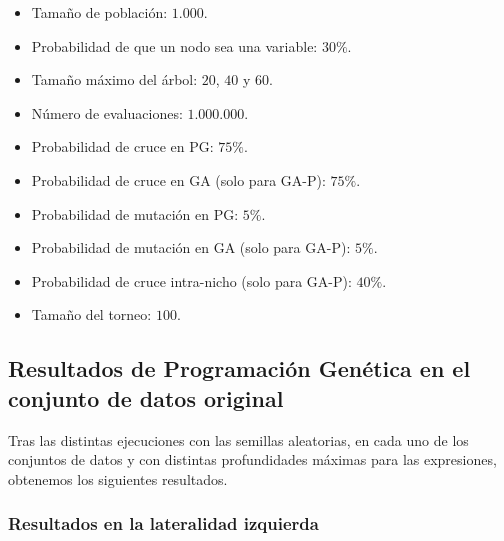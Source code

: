 \begin{itemize}
	\item Tamaño de población: $1.000$.
	\item Probabilidad de que un nodo sea una variable: $30\%$.
	\item Tamaño máximo del árbol: $20$, $40$ y $60$.
	\item Número de evaluaciones: $1.000.000$.
	\item Probabilidad de cruce en PG: $75\%$.
	\item Probabilidad de cruce en GA (solo para GA-P): $75\%$.
	\item Probabilidad de mutación en PG: $5\%$.
	\item Probabilidad de mutación en GA (solo para GA-P): $5\%$.
	\item Probabilidad de cruce intra-nicho (solo para GA-P): $40\%$.
	\item Tamaño del torneo: $100$.
\end{itemize}

\newpage

\subsection{Resultados de Programación Genética en el conjunto de datos original}

Tras las distintas ejecuciones con las semillas aleatorias, en cada uno de los conjuntos de datos y con distintas profundidades máximas para las expresiones, obtenemos los siguientes resultados.


\subsubsection{Resultados en la lateralidad izquierda}

